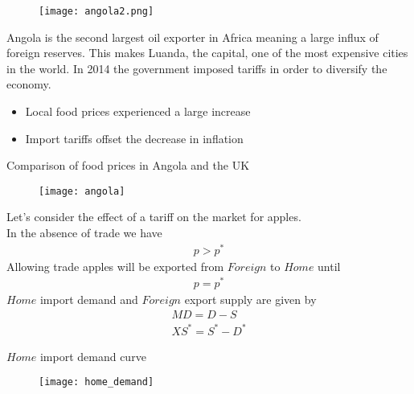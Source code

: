 \documentclass{beamer}
\begin{document}
\begin{frame}
  \begin{figure}
    \texttt{[image: angola2.png]}
  \end{figure}
\end{frame}

\begin{frame}
  Angola is the second largest oil exporter in Africa meaning a large influx of foreign reserves.
  This makes Luanda, the capital, one of the most expensive cities in the world.
  In 2014 the government imposed tariffs in order to diversify the economy.
  \begin{itemize}
    \item Local food prices experienced a large increase
    \item Import tariffs offset the decrease in inflation
  \end{itemize}
\end{frame}

\begin{frame}{Comparison of food prices in Angola and the UK}
  \begin{figure}
    \texttt{[image: angola]}
  \end{figure}
\end{frame}

\begin{frame}
  Let's consider the effect of a tariff on the market for apples.\\ 
  In the absence of trade we have
  \begin{align*}
    p > p^*
  \end{align*}
  \medskip
  Allowing trade apples will be exported from $Foreign$ to $Home$ until
  \begin{align*}
    p = p^*
  \end{align*}
  \medskip
  $Home$ import demand and $Foreign$ export supply are given by
  \begin{align*}
    MD=D-S\\
    XS^*=S^*-D^*
  \end{align*}
\end{frame}

\begin{frame}{$Home$ import demand curve}
  \begin{figure}
    \texttt{[image: home\_demand]}
  \end{figure}  
\end{frame}
\end{document}
